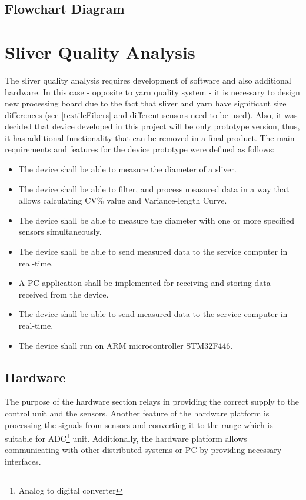 \documentclass[twoside]{ctuthesis}
\theoremstyle{plain}
\theoremstyle{definition}
\theoremstyle{note}
\begin{document}
\subsection{Flowchart Diagram}


\section{Sliver Quality Analysis}
 The sliver quality analysis requires development of software and also additional hardware. In this case - opposite to yarn quality system - it is necessary to design new processing board due to the fact that sliver and yarn have significant size differences (see \ref{textileFibers} and different sensors need to be used). Also, it was decided that device developed in this project will be only prototype version, thus, it has additional functionality that can be removed in a final product. The main requirements and features for the device prototype were defined as follows:
\begin{itemize}
	\setlength{\itemsep}{5pt}
	\item The device shall be able to measure the diameter of a sliver.
	\item The device shall be able to filter, and process measured data in a way that allows calculating CV\% value and Variance-length Curve.
	\item The device shall be able to measure the diameter with one or more specified sensors simultaneously.
	\item The device shall be able to send measured data to the service computer in real-time.
	\item A PC application shall be implemented for receiving and storing data received from the device.
	\item The device shall be able to send measured data to the service computer in real-time.
	\item The device shall run on ARM microcontroller STM32F446.
\end{itemize}
\subsection{Hardware}
The purpose of the hardware section relays in providing the correct supply to the control unit and the sensors. Another feature of the hardware platform is processing the signals from sensors and converting it to the range which is suitable for ADC\footnote{Analog to digital converter} unit. Additionally, the hardware platform allows communicating with other distributed systems or PC by providing necessary interfaces. 
\end{document}
